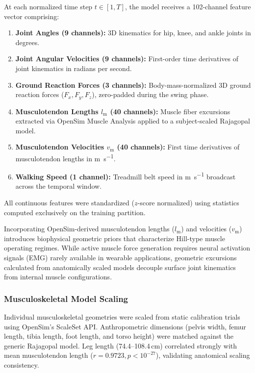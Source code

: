 \documentclass[fleqn,10pt]{wlscirep}
\newcommand{\lm}{l_{\mathrm{m}}}
\newcommand{\vm}{v_{\mathrm{m}}}
\begin{document}
At each normalized time step $t \in [1, T]$, the model receives a 102-channel feature vector comprising:
\begin{enumerate}
\item \textbf{Joint Angles (9 channels):} 3D kinematics for hip, knee, and ankle joints in degrees.
\item \textbf{Joint Angular Velocities (9 channels):} First-order time derivatives of joint kinematics in radians per second.
\item \textbf{Ground Reaction Forces (3 channels):} Body-mass-normalized 3D ground reaction forces ($F_x, F_y, F_z$), zero-padded during the swing phase.
\item \textbf{Musculotendon Lengths $\lm$ (40 channels):} Muscle fiber excursions extracted via OpenSim Muscle Analysis\cite{delp2007opensim} applied to a subject-scaled Rajagopal model\cite{rajagopal2016opensim}.
\item \textbf{Musculotendon Velocities $\vm$ (40 channels):} First time derivatives of musculotendon lengths in \si{\metre\per\second}.
\item \textbf{Walking Speed (1 channel):} Treadmill belt speed in \si{\metre\per\second} broadcast across the temporal window.
\end{enumerate}
All continuous features were standardized ($z$-score normalized) using statistics computed exclusively on the training partition.

Incorporating OpenSim-derived musculotendon lengths ($\lm$) and velocities ($\vm$) introduces biophysical geometric priors that characterize Hill-type muscle operating regimes. While active muscle force generation requires neural activation signals (EMG) rarely available in wearable applications, geometric excursions calculated from anatomically scaled models decouple surface joint kinematics from internal muscle configurations\cite{delp2007opensim}.

\subsubsection{Musculoskeletal Model Scaling}
Individual musculoskeletal geometries were scaled from static calibration trials using OpenSim's ScaleSet API. Anthropometric dimensions (pelvis width, femur length, tibia length, foot length, and torso height) were matched against the generic Rajagopal model. Leg length (74.4--108.4\,\si{\centi\metre}) correlated strongly with mean musculotendon length ($r = 0.9723, p < 10^{-27}$), validating anatomical scaling consistency.
\end{document}
